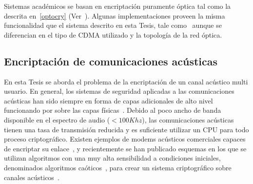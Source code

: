 Sistemas académicos se basan en encriptación puramente óptica tal como la descrita en~\ref{optocry} (Ver~\cite{cincotti2009secure}). Algunas implementaciones proveen la misma funcionalidad que el sistema descrito en esta Tesis, tale como~\cite{nadarajah2006implementation} aunque se diferencian en el tipo de CDMA utilizado y la topología de la red óptica.

\subsection{Encriptación de comunicaciones acústicas}

En esta Tesis se aborda el problema de la encriptación de un canal acústico multi usuario.
En general, los sistemas de seguridad aplicadas a las comunicaciones acústicas han sido siempre en forma de capas adicionales de alto nivel funcionando por sobre las capas físicas~\cite{steer1990secure}. Debido al poco ancho de banda disponible en el espectro de audio ($< 100 Khz$), las comunicaciones acústicas tienen una tasa de transmisión reducida y es suficiente utilizar un CPU para todo proceso criptográfico. Existen ejemplos de modems acústicos comerciales capaces de encriptar su enlace~\cite{arcelect}, y recientemente se han publicado esquemas en los que se utilizan algoritmos con una muy alta sensibilidad a condiciones iniciales, denominados algoritmos caóticos~\cite{kellert1994wake}, para crear un sistema criptográfico sobre canales acústicos~\cite{gnanajeyaraman2009audio}.
